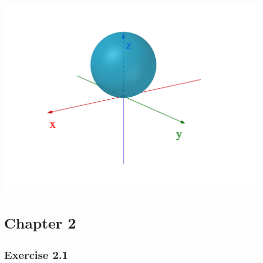 \documentclass[11pt,fleqn]{book} %
\begin{document}
\begin{enumerate}
\begin{minipage}[c]{0.2\linewidth}
\begin{center}
        \end{center}
    \end{minipage}
    \begin{minipage}[c]{0.5\linewidth}
        \begin{center} \includegraphics[width=0.9\linewidth]{Plots/e_1_2/6.png} \end{center}
    \end{minipage}
\end{enumerate}

\section*{Chapter 2}

\subsection*{Exercise 2.1}
\end{document}
